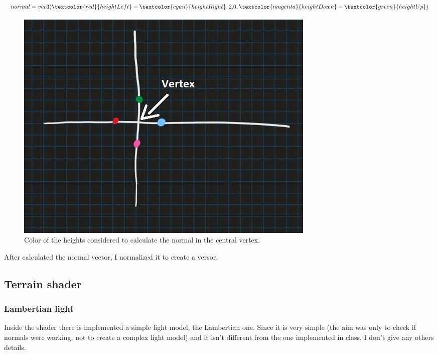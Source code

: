 \begin{equation}
	normal = vec3(\textcolor{red}{heightLeft} - \textcolor{cyan}{heightRight}, 2.0, \textcolor{magenta}{heightDown} - \textcolor{green}{heightUp})		
\end{equation}

\begin{figure}[hbt!]
	\centering
	\includegraphics[width= 1
	\textwidth]{images/normalSchema.jpg}
	\caption{Color of the heights considered to calculate the normal in the central vertex.}
\end{figure} 

\noindent
After calculated the normal vector, I normalized it to create a versor.

\subsection{Terrain shader}

\subsubsection{Lambertian light}
Inside the shader there is implemented a simple light model, the Lambertian one. Since it is very simple (the aim was only to check if normals were working, not to create a complex light model) and it isn't different from the one implemented in class, I don't give any others details.

